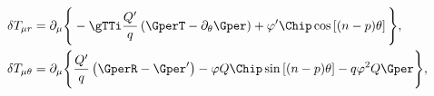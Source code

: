 \begin{equation}
\begin{aligned}
\delta T_{\mu r} & = \partial_\mu \Bigg\{- \gTTi \frac{Q'}{q}
\left(\GperT - \partial_\theta \Gper \right) + \varphi' \Chip
\cos\left[(n-p)\theta\right] \Bigg\},\\ \delta T_{\mu \theta} & =
\partial_\mu \Bigg\{ \frac{Q'}{q} \left(\GperR - \Gper' \right)
-\varphi Q \Chip \sin\left[(n-p)\theta \right] -q \varphi^2 Q \Gper
\Bigg\},
\end{aligned}
\end{equation}

